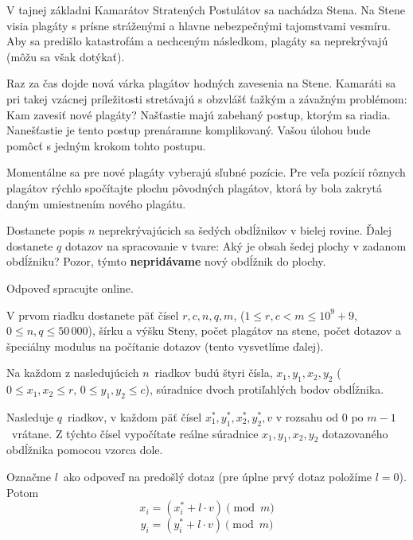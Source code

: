 
\usepackage[slovak]{babel}





V tajnej základni Kamarátov Stratených Postulátov sa nachádza Stena. Na Stene
visia plagáty s prísne stráženými a hlavne nebezpečnými tajomstvami vesmíru.
Aby sa predišlo katastrofám a nechceným následkom, plagáty sa neprekrývajú
(môžu sa však dotýkať).

Raz za čas dojde nová várka plagátov hodných zavesenia na Stene. Kamaráti sa
pri takej vzácnej príležitosti stretávajú s obzvlášť ťažkým a závažným problémom:
Kam zavesiť nové plagáty? Našťastie majú zabehaný postup, ktorým sa riadia. Nanešťastie
je tento postup prenáramne komplikovaný. Vašou úlohou bude pomôcť s jedným krokom
tohto postupu.

Momentálne sa pre nové plagáty vyberajú sľubné pozície. Pre veľa pozícií rôznych
plagátov rýchlo spočítajte plochu pôvodných plagátov, ktorá by bola zakrytá
daným umiestnením nového plagátu.


Dostanete popis $n$ neprekrývajúcich sa šedých obdĺžnikov v bielej rovine. Ďalej dostanete $q$
dotazov na spracovanie v tvare: Aký je obsah šedej plochy v zadanom obdĺžniku? Pozor,
týmto \textbf{nepridávame} nový obdĺžnik do plochy.

Odpoveď spracujte online.


V prvom riadku dostanete päť čísel $r, c, n, q, m$, ($1 \leq r, c < m \leq 10^9 + 9$, $0 \leq n,q \leq 50\,000$),
šírku a výšku Steny, počet plagátov na stene, počet dotazov a špeciálny modulus
na počítanie dotazov (tento vysvetlíme ďalej).

Na každom z nasledujúcich $n$ riadkov budú štyri čísla, $x_1, y_1, x_2, y_2$ ($0 \leq x_1, x_2 \leq r$,
$0 \leq y_1, y_2 \leq c$), súradnice dvoch protiľahlých bodov obdĺžnika.

Nasleduje $q$ riadkov, v každom päť čísel $x_1^*, y_1^*, x_2^*, y_2^*, v$ v rozsahu od
$0$ po $m - 1$ vrátane. Z týchto čísel vypočítate reálne súradnice $x_1, y_1, x_2, y_2$
dotazovaného obdĺžnika pomocou vzorca dole.

Označme $l$ ako odpoveď na predošlý dotaz (pre úplne prvý dotaz položíme $l=0$). Potom
$$x_i = (x_i^* + l \cdot v) \pmod m$$
$$y_i = (y_i^* + l \cdot v) \pmod m$$

